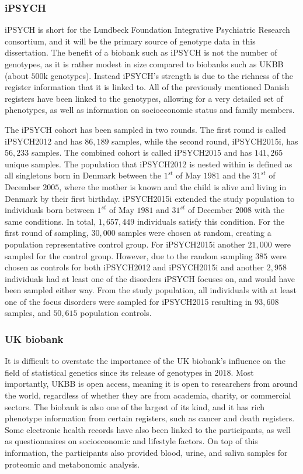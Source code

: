 \subsubsection{iPSYCH}
iPSYCH is short for the Lundbeck Foundation Integrative Psychiatric Research consortium, and it will be the primary source of genotype data in this dissertation. The benefit of a biobank such as iPSYCH is not the number of genotypes, as it is rather modest in size compared to biobanks such as UKBB (about $ 500 $k genotypes). Instead iPSYCH's strength is due to the richness of the register information that it is linked to. All of the previously mentioned Danish registers have been linked to the genotypes, allowing for a very detailed set of phenotypes, as well as information on socioeconomic status and family members.

The iPSYCH cohort has been sampled in two rounds. The first round is called iPSYCH2012 and has $ 86,189 $ samples, while the second round, iPSYCH2015i, has $ 56,233 $ samples. The combined cohort is called iPSYCH2015 and has $ 141,265 $ unique samples. The population that iPSYCH2012 is nested within is defined as all singletons born in Denmark between the $ 1^{st} $ of May $ 1981 $ and the $ 31^{st} $ of December $ 2005 $, where the mother is known and the child is alive and living in Denmark by their first birthday. iPSYCH2015i extended the study population to individuals born between $ 1^{st} $ of May $ 1981 $ and $ 31^{st} $ of December $ 2008 $ with the same conditions. In total, $ 1,657,449 $ individuals satisfy this condition. For the first round of sampling, $ 30,000 $ samples were chosen at random, creating a population representative control group. For iPSYCH2015i another $ 21,000 $ were sampled for the control group. However, due to the random sampling $ 385 $ were chosen as controls for both iPSYCH2012 and iPSYCH2015i and another $ 2,958 $ individuals had at least one of the disorders iPSYCH focuses on, and would have been sampled either way. From the study population, all individuals with at least one of the focus disorders were sampled for iPSYCH2015 resulting in $ 93,608 $ samples, and $ 50,615 $ population controls. 

\subsubsection{UK biobank}

It is difficult to overstate the importance of the UK biobank's influence on the field of statistical genetics since its release of genotypes in 2018. Most importantly, UKBB is open access, meaning it is open to researchers from around the world, regardless of whether they are from academia, charity, or commercial sectors. The biobank is also one of the largest of its kind, and it has rich phenotype information from certain registers, such as cancer and death registers. Some electronic health records have also been linked to the participants, as well as questionnaires on socioeconomic and lifestyle factors. On top of this information, the participants also provided blood, urine, and saliva samples for proteomic and metabonomic analysis.


